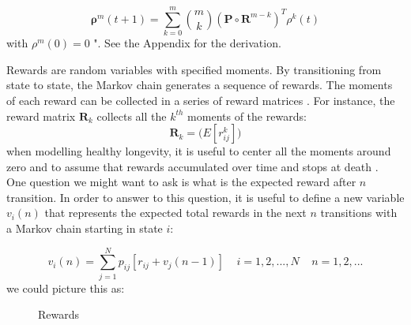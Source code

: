 \documentclass[\main/main.tex]{subfiles}
\begin{document}
\begin{equation}\label{moments}
    \bm{\rho}^m(t+1) = \sum_{k=0}^{m} {m \choose k} (\mathbf{P} \circ \mathbf{R}^{m-k}) ^ T \rho^k(t)
\end{equation}
with $\rho^m(0)=0$ ". See the Appendix for the derivation. 





Rewards are random variables with specified moments. By transitioning from state to state, the Markov chain generates a sequence of rewards. The moments of each reward can be collected in a series of reward matrices \citep{Caswell2018}. For instance, the reward matrix $\mathbf{R}_k$ collects all the $k^{th}$ moments of the rewards:
\begin{equation}
\mathbf{R}_k = \big( E[r^k_{ij}] \big)
\end{equation}
when modelling healthy longevity, it is useful to center all the moments around zero and to assume that rewards accumulated over time and stops at death \citep{Caswell2018}.\\

One question we might want to ask is what is the expected reward after $n$ transition. In order to answer to this question, it is useful to define a new variable $v_i(n)$ that represents the expected total rewards in the next $n$ transitions with a Markov chain starting in state $i$:

\begin{equation}\label{rewards}
    v_i(n) = \sum_{j=1}^N p_{ij} [ r_{ij} + v_j(n-1) ] \; \;\;\; i = 1,2,...,N \;\;\;\; n=1,2,...
\end{equation}
we could picture this as:

\begin{figure}[H]
\centering
{}
\caption{Rewards}
\label{fig:markov_chain}
\end{figure}
\end{document}
